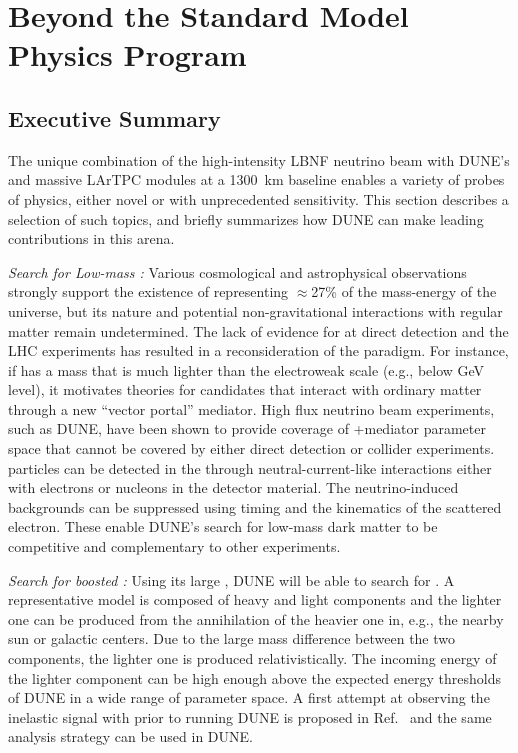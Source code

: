\chapter{Beyond the Standard Model  Physics Program }
\label{ch:bsm}
\section{Executive Summary}
\label{phys:bsm:execsumm}

The unique combination of the high-intensity LBNF neutrino beam with DUNE's   and massive LArTPC  modules at a \SI{1300}{km} baseline enables a variety of probes of  physics, either novel or with unprecedented sensitivity. This section describes a selection of such topics, and briefly summarizes how DUNE can make leading contributions in this arena.


\textit{Search for Low-mass :} Various cosmological and astrophysical observations strongly support the existence of  representing $\approx$27\% of the mass-energy of the universe, but its nature and potential non-gravitational interactions with regular matter remain undetermined. The lack of evidence for  at direct detection and the LHC experiments has resulted in a reconsideration of the  paradigm. For instance, if  has a mass that is much lighter than the electroweak scale (e.g., below GeV level), it motivates theories for  candidates that interact with ordinary matter through a new ``vector portal'' mediator. High flux neutrino beam experiments, such as DUNE, have been shown to provide coverage of +mediator parameter space that cannot be covered by either direct detection or collider experiments.  particles can be detected in the   through neutral-current-like interactions either with electrons or nucleons in the detector material. The neutrino-induced backgrounds can be suppressed using timing and the kinematics of the scattered electron. These enable DUNE's search for low-mass dark matter to be competitive and complementary to other experiments.

\textit{Search for boosted :} Using its large , DUNE will be able to search for . A representative model is composed of heavy and light  components and the lighter one can be produced from the annihilation of the heavier one in, e.g., the nearby sun or galactic centers. Due to the large mass difference between the two   components, the lighter one is produced relativistically. The incoming energy of the lighter  component can be high enough above the expected energy thresholds of DUNE in a wide range of parameter space. A first attempt at observing the inelastic  signal with  prior to running DUNE is proposed in Ref.~\cite{Chatterjee:2018mej}  and the same analysis strategy can be used in DUNE.

